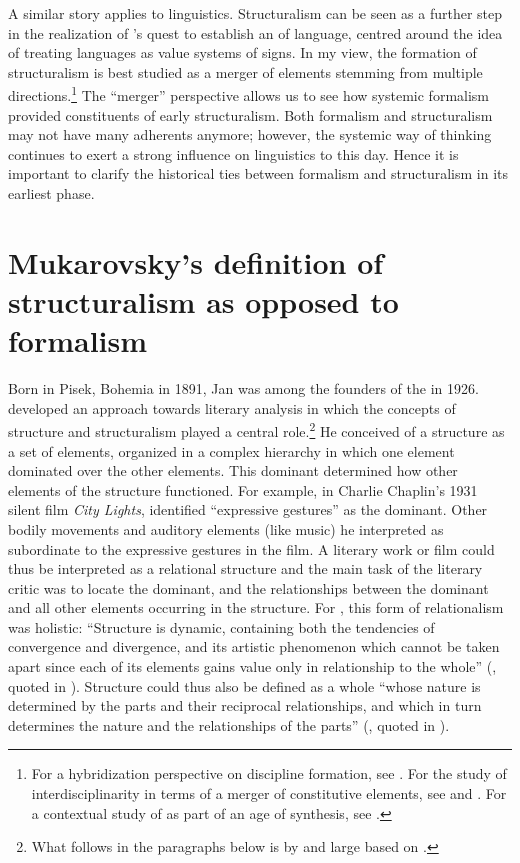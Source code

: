 \documentclass[output=paper]{langscibook}
\begin{document}
A similar story applies to linguistics.  Structuralism can be seen as a further step in the realization of {\Saussure}'s quest to establish an  of language, centred around the idea of treating languages as value systems of signs. In my view, the formation of structuralism is best studied as a merger of elements stemming from multiple directions.\footnote{For a hybridization perspective on discipline formation, see \citet{Karstens2012}. For the study of interdisciplinarity in terms of a merger of constitutive elements, see \citet{Graff2015} and \citet{Bod2019}. For a contextual study of {\Jakobson} as part of an age of synthesis, see \citet{Karstens2017lonely}.} The ``merger'' perspective allows us to see how systemic formalism provided constituents of early structuralism. Both formalism and structuralism may not have many adherents anymore; however, the systemic way of thinking continues to exert a strong influence on linguistics to this day. Hence it is important to clarify the historical ties between formalism and structuralism in its earliest phase.

\section{Mukarovsky's definition of structuralism as opposed to formalism}
\label{sec:karstens:mukarovsky}

Born in Pisek, Bohemia in 1891, Jan {\Mukarovsky} was among the founders of the {\PragueLinguisticCircle} in 1926. {\Mukarovsky} developed an approach towards literary analysis in which the concepts of structure and structuralism played a central role.\footnote{What follows in the paragraphs below is by and large based on \citet[22--44]{Galan1985}.} He conceived of a structure as a set of elements, organized in a complex hierarchy in which one element dominated over the other elements. This dominant determined how other elements of the structure functioned. For example, in Charlie Chaplin's 1931 silent film \emph{City Lights}, {\Mukarovsky} identified ``expressive gestures'' as the dominant. Other bodily movements and auditory elements (like music) he interpreted as subordinate to the expressive gestures in the film. A literary work or film could thus be interpreted as a relational structure and the main task of the literary critic was to locate the dominant, and the relationships between the dominant and all other elements occurring in the structure. For {\Mukarovsky}, this form of relationalism was holistic: ``Structure is dynamic, containing both the tendencies of convergence and divergence, and its artistic phenomenon which cannot be taken apart since each of its elements gains value only in relationship to the whole'' ({\Mukarovsky}, quoted in \citealt[30]{Galan1985}). Structure could thus also be defined as a whole ``whose nature is determined by the parts and their reciprocal relationships, and which in turn determines the nature and the relationships of the parts'' ({\Mukarovsky}, quoted in \citealt[35]{Galan1985}).
\end{document}
